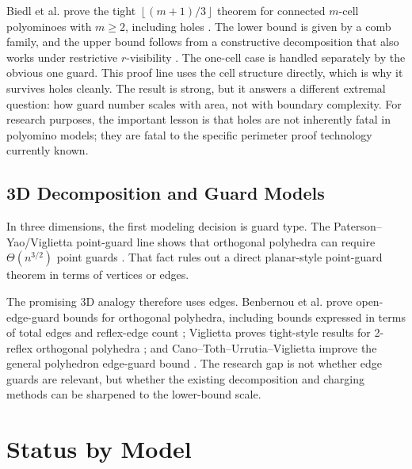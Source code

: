 \documentclass[11pt]{article}
\newcommand{\floor}[1]{\left\lfloor #1 \right\rfloor}
\begin{document}
Biedl et al. prove the tight $\floor{(m+1)/3}$ theorem for connected
$m$-cell polyominoes with $m\geq 2$, including holes
\cite[Cor.~1]{BiedlEtAl2012}.  The lower bound is given by a comb family, and
the upper bound follows from a constructive decomposition that also works
under restrictive $r$-visibility \cite[Fig.~3 and Theorem~1]{BiedlEtAl2012}.
The one-cell case is handled separately by the obvious one guard.  This proof
line uses the cell structure directly, which is why it survives holes cleanly.
The result is strong, but it answers a different extremal question: how guard
number scales with area, not with boundary complexity.  For research purposes,
the important lesson is that holes are not inherently fatal in polyomino
models; they are fatal to the specific perimeter proof technology currently
known.

\subsection{3D Decomposition and Guard Models}

In three dimensions, the first modeling decision is guard type.  The
Paterson--Yao/Viglietta point-guard line shows that orthogonal polyhedra can
require $\Theta(n^{3/2})$ point guards \cite{PatersonYao1992,VigliettaThesis}.
That fact rules out a direct planar-style point-guard theorem in terms of
vertices or edges.

The promising 3D analogy therefore uses edges.  Benbernou et al. prove
open-edge-guard bounds for orthogonal polyhedra, including bounds expressed in
terms of total edges and reflex-edge count
\cite[Theorem~5 and Corollaries~6--7]{BenbernouEtAl2011}; Viglietta proves
tight-style results for 2-reflex orthogonal polyhedra \cite{Viglietta2020}; and
Cano--Toth--Urrutia--Viglietta improve the general polyhedron edge-guard
bound \cite{CanoTothUrrutiaViglietta2022}.  The research gap is not whether
edge guards are relevant, but whether the existing decomposition and charging
methods can be sharpened to the lower-bound scale.

\section{Status by Model}
\end{document}
